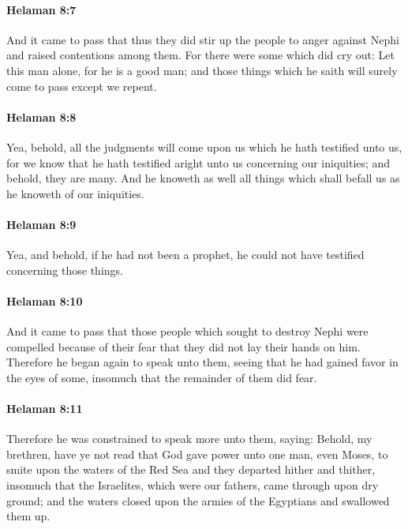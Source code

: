		\paragraph{Helaman 8:7} %
			\label{HELAMAN-8-7}

			And it came to pass that
			thus they did stir up the people to anger against Nephi
			and raised contentions among them.
			For there were some which did cry out:
			Let this man alone, for he is a good man;
			and those things which he saith will surely come to pass except we repent.

		\paragraph{Helaman 8:8} %
			\label{HELAMAN-8-8}

			Yea, behold, all the judgments will come upon us
			which he hath testified unto us,
			for we know that he hath testified aright unto us concerning our iniquities;
			and behold, they are many.
			And he knoweth as well all things which shall befall us
			as he knoweth of our iniquities.

		\paragraph{Helaman 8:9} %
			\label{HELAMAN-8-9}

			Yea, and behold, if he had not been a prophet,
			he could not have testified concerning those things.

		\paragraph{Helaman 8:10} %
			\label{HELAMAN-8-10}

			And it came to pass that those people
			which sought to destroy Nephi
			were compelled because of their fear
			that they did not lay their hands on him.
			Therefore he began again to speak unto them,
			seeing that he had gained favor in the eyes of some,
			insomuch that the remainder of them did fear.

		\paragraph{Helaman 8:11} %
			\label{HELAMAN-8-11}

			Therefore he was constrained to speak more unto them, saying:
			Behold, my brethren, have ye not read
			that God gave power unto one man, even Moses,
			to smite upon the waters of the Red Sea
			and they departed hither and thither,
			insomuch that the Israelites, which were our fathers,
			came through upon dry ground;
			and the waters closed upon the armies of the Egyptians
			and swallowed them up.

